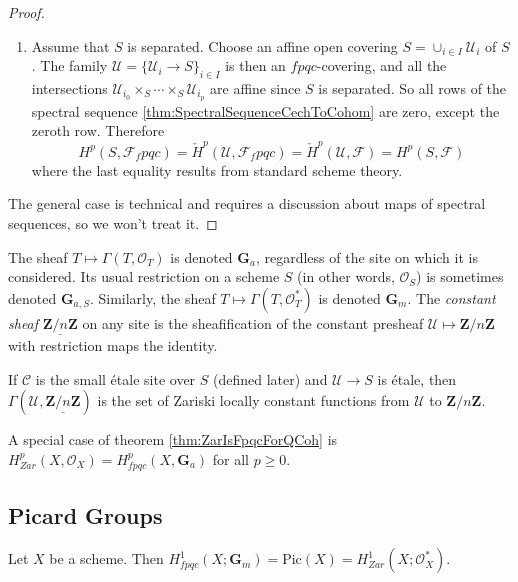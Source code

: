 \begin{proof}
\begin{enumerate}
\item
Assume that $S$ is separated. Choose an affine open covering $S = \cup_{i \in I} \mathcal{U}_i$ of $S$. The family $\mathcal{U} = \{ \mathcal{U}_i \to S \}_{i \in I}$ is then an $fpqc$-covering, and all the intersections $\mathcal{U}_{i_0} \times_S \cdots \times_S \mathcal{U}_{i_p}$ are affine since $S$ is separated. So all rows of the spectral sequence \ref{thm:SpectralSequenceCechToCohom} are zero, except the zeroth row. Therefore
$$
H^p(S, \mathcal{F}_fpqc) = \check H^p(\mathcal{U}, \mathcal{F}_fpqc) = \check H^p(\mathcal{U}, \mathcal{F}) = H^p(S, \mathcal{F})
$$
where the last equality results from standard scheme theory.
\end{enumerate}
The general case is technical and requires a discussion about maps of spectral sequences, so we won't treat it.
\end{proof}

\begin{definition}
The sheaf $T \mapsto \Gamma(T, \mathcal{O}_T)$ is denoted $\mathbf{G}_a$, regardless of the site on which it is considered. Its usual restriction on a scheme $S$ (in other words, $\mathcal{O}_S$) is sometimes denoted $\mathbf{G}_{a,S}$. Similarly, the sheaf $T \mapsto \Gamma(T, \mathcal{O}^*_T)$ is denoted $\mathbf{G}_m$.
The \emph{constant sheaf} $\underline{\mathbf{Z}/n\mathbf{Z}}$ on any site is the sheafification of the constant presheaf $\mathcal{U} \mapsto \mathbf{Z}/n\mathbf{Z}$ with restriction maps the identity.
\end{definition}

\begin{remark}
If $\mathcal{C}$ is the small \'etale site over $S$ (defined later) and $\mathcal{U} \to S$ is \'etale, then $\Gamma(\mathcal{U}, \underline{\mathbf{Z}/n\mathbf{Z}})$ is the set of Zariski locally constant functions from $\mathcal{U}$ to $\mathbf{Z}/n\mathbf{Z}$.
\end{remark}

\begin{remark}
A special case of theorem \ref{thm:ZarIsFpqcForQCoh} is $H_{Zar}^p (X, \mathcal{O}_X) = H_{fpqc}^p(X, \mathbf{G}_a)$ for all $p \geq 0$.
\end{remark}

\subsection{Picard Groups}

\begin{theorem}
Let $X$ be a scheme. Then $H_{fpqc}^1(X ; \mathbf{G}_m) = \text{Pic} (X) = H_{Zar}^1(X; \mathcal{O}_X^*)$.
\end{theorem}

